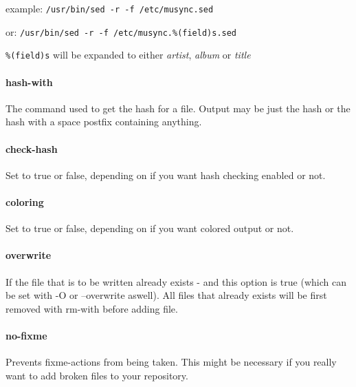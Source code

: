 example: \verb!/usr/bin/sed -r -f /etc/musync.sed!

or: \verb!/usr/bin/sed -r -f /etc/musync.%(field)s.sed!

{\scriptsize\verb!%(field)s! will be expanded to either \emph{artist}, \emph{album} or \emph{title}}

\paragraph{hash-with}
The command used to get the hash for a file. Output may be just the hash or the hash with a space postfix containing anything. 

\paragraph{check-hash}
Set to true or false, depending on if you want hash checking enabled or not. 

\paragraph{coloring}
Set to true or false, depending on if you want colored output or not. 

\paragraph{overwrite}
If the file that is to be written already exists - and this option is true (which can be set with -O or --overwrite aswell). All files that already exists will be first removed with rm-with before adding file. 

\paragraph{no-fixme}
Prevents fixme-actions from being taken. This might be necessary if you really want to add broken files to your repository.
